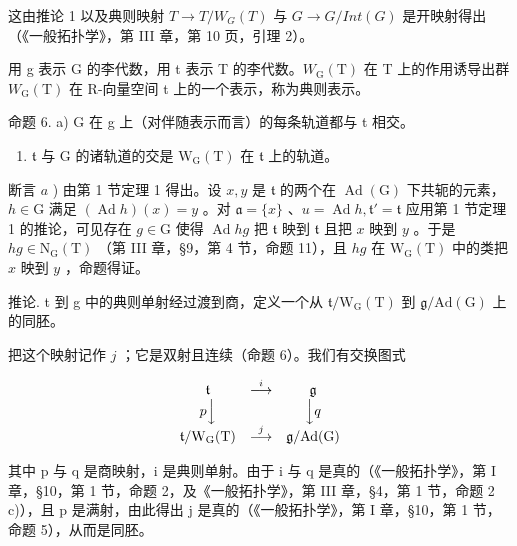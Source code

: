 这由推论 1 以及典则映射 \(T \rightarrow T/W_{G}(T)\) 与 \(G \rightarrow G/Int(G)\) 是开映射得出（《一般拓扑学》，第 III 章，第 10 页，引理 2）。

用 g 表示 G 的李代数，用 t 表示 T 的李代数。\(W_{\mathrm{G}}(\mathrm{T})\) 在 T 上的作用诱导出群 \(W_{\mathrm{G}}(\mathrm{T})\) 在 R-向量空间 t 上的一个表示，称为典则表示。

命题 6. a) G 在 g 上（对伴随表示而言）的每条轨道都与 t 相交。

\begin{enumerate}
\def\labelenumi{\alph{enumi})}
\setcounter{enumi}{1}
\tightlist
\item
  \(\mathfrak{t}\) 与 \(\mathrm{G}\) 的诸轨道的交是 \(\mathrm{W_G(T)}\) 在 \(\mathfrak{t}\) 上的轨道。
\end{enumerate}

断言 \(a\) ) 由第 1 节定理 1 得出。设 \(x, y\) 是 \(\mathfrak{t}\) 的两个在 \(\operatorname{Ad}(\mathrm{G})\) 下共轭的元素，\(h \in \mathrm{G}\) 满足 \((\operatorname{Ad} h)(x) = y\) 。对 \(\mathfrak{a} = \{x\}\) 、\(u = \operatorname{Ad} h, \mathfrak{t}' = \mathfrak{t}\) 应用第 1 节定理 1 的推论，可见存在 \(g \in \mathrm{G}\) 使得 \(\operatorname{Ad} hg\) 把 \(\mathfrak{t}\) 映到 \(\mathfrak{t}\) 且把 \(x\) 映到 \(y\) 。于是 \(hg \in \mathrm{N}_{\mathrm{G}}(\mathrm{T})\) （第 III 章，§9，第 4 节，命题 11），且 \(hg\) 在 \(\mathrm{W}_{\mathrm{G}}(\mathrm{T})\) 中的类把 \(x\) 映到 \(y\) ，命题得证。

推论. t 到 g 中的典则单射经过渡到商，定义一个从 \(\mathfrak{t}/\mathrm{W}_{\mathrm{G}}(\mathrm{T})\) 到 \(\mathfrak{g}/\mathrm{Ad}(\mathrm{G})\) 上的同胚。

把这个映射记作 \(j\) ；它是双射且连续（命题 6）。我们有交换图式

\[
\begin{array}{c c c} \mathfrak {t} & \stackrel {{i}} {{\longrightarrow}} & \mathfrak {g} \\ p \Big \downarrow & & \Big \downarrow q \\ \mathfrak {t} / \mathrm{W} _ {\mathrm{G}} (\mathrm{T}) & \stackrel {{j}} {{\longrightarrow}} & \mathfrak {g} / \mathrm{Ad} (\mathrm{G}) \end{array}
\]

其中 p 与 q 是商映射，i 是典则单射。由于 i 与 q 是真的（《一般拓扑学》，第 I 章，§10，第 1 节，命题 2，及《一般拓扑学》，第 III 章，§4，第 1 节，命题 2 c)），且 p 是满射，由此得出 j 是真的（《一般拓扑学》，第 I 章，§10，第 1 节，命题 5），从而是同胚。

